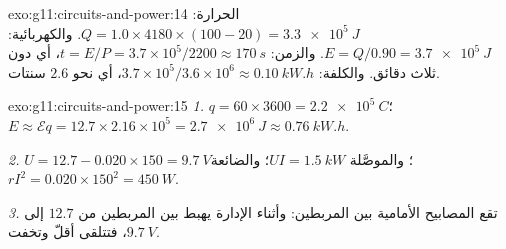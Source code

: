\begin{solution}{exo:g11:circuits-and-power:14}
الحرارة: $Q = 1.0 \times 4180 \times (100 - 20) = \qty{3.3e5}{J}$.
والكهربائية: $E = Q/0.90 = \qty{3.7e5}{J}$. والزمن: $t = E/P =
3.7\times10^{5}/2200 \approx \qty{170}{s}$، أي دون ثلاث دقائق. والكلفة:
$3.7\times10^{5}/3.6\times10^{6} \approx \qty{0.10}{kW.h}$، أي نحو $2.6$
سنتات.
\end{solution}

\begin{solution}{exo:g11:circuits-and-power:15}
\emph{1.} $q = 60 \times 3600 = \qty{2.2e5}{C}$؛ $E \approx \mathcal{E}q
= 12.7 \times 2.16\times10^{5} = \qty{2.7e6}{J} \approx \qty{0.76}{kW.h}$.

\emph{2.} $U = 12.7 - 0.020 \times 150 = \qty{9.7}{V}$؛ والموصَّلة
$UI = \qty{1.5}{kW}$؛ والضائعة $rI^2 = 0.020 \times 150^2 = \qty{450}{W}$.

\emph{3.} تقع المصابيح الأمامية بين المربطين: وأثناء الإدارة يهبط
 بين المربطين من $12.7$ إلى $\qty{9.7}{V}$، فتتلقى
 أقلّ وتخفت.
\end{solution}

